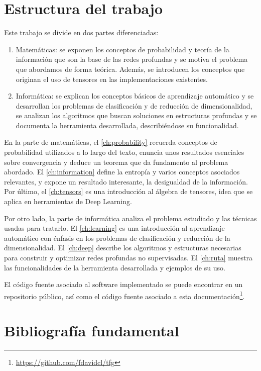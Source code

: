 \section{Estructura del trabajo}

Este trabajo se divide en dos partes diferenciadas:
\begin{enumerate}
\item Matemáticas: se exponen los conceptos de probabilidad y teoría de la información que son la base de las redes profundas y se motiva el problema que abordamos de forma teórica. Además, se introducen los conceptos que originan el uso de tensores en las implementaciones existentes.
\item Informática: se explican los conceptos básicos de aprendizaje automático y se desarrollan los problemas de clasificación y de reducción de dimensionalidad, se analizan los algoritmos que buscan soluciones en estructuras profundas y se documenta la herramienta desarrollada, describiéndose su funcionalidad.
\end{enumerate}

En la parte de matemáticas, el \autoref{ch:probability} recuerda conceptos de probabilidad utilizados a lo largo del texto, enuncia unos resultados esenciales sobre convergencia y deduce un teorema que da fundamento al problema abordado. El \autoref{ch:information} define la entropía y varios conceptos asociados relevantes, y expone un resultado interesante, la desigualdad de la información. Por último, el \autoref{ch:tensors} es una introducción al álgebra de tensores, idea que se aplica en herramientas de Deep Learning.

Por otro lado, la parte de informática analiza el problema estudiado y las técnicas usadas para tratarlo. El \autoref{ch:learning} es una introducción al aprendizaje automático con énfasis en los problemas de clasificación y reducción de la dimensionalidad. El \autoref{ch:deep} describe los algoritmos y estructuras necesarias para construir y optimizar redes profundas no supervisadas. El \autoref{ch:ruta} muestra las funcionalidades de la herramienta desarrollada y ejemplos de su uso.

El código fuente asociado al software implementado se puede encontrar en un repositorio público, así como el código fuente asociado a esta documentación\footnote{\url{https://github.com/fdavidcl/tfg}}.

\section{Bibliografía fundamental}

